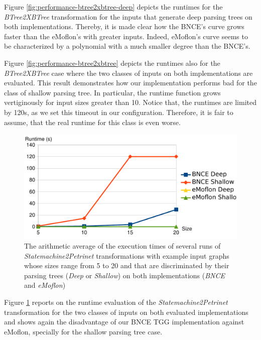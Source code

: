 Figure \ref{fig:performance-btree2xbtree-deep} depicts the runtimes for the \emph{BTree2XBTree} transformation for the inputs that generate deep parsing trees on both implementations. Thereby, it is made clear how the BNCE's curve grows faster than the eMoflon's with greater inputs. Indeed, eMoflon's curve seems to be characterized by a polynomial with a much smaller degree than the BNCE's.

Figure \ref{fig:performance-btree2xbtree} depicts the runtimes also for the \emph{BTree2XBTree} case where the two classes of inputs on both implementations are evaluated. This result demonstrates how our implementation performs bad for the class of shallow parsing tree. In particular, the runtime function grows vertiginously for input sizes greater than 10. Notice that, the runtimes are limited by 120s, as we set this timeout in our configuration. Therefore, it is fair to assume, that the real runtime for this class is even worse.

\begin{figure}
	\centering
	\includegraphics[width=.6\textwidth]{figures/performance/statemachine2petrinet}
	\caption{The arithmetic average of the execution times of several runs of \emph{Statemachine2Petrinet} transformations with example input graphs whose sizes range from 5 to 20 and that are discriminated by their parsing trees (\emph{Deep} or \emph{Shallow}) on both implementations (\emph{BNCE} and \emph{eMoflon})}
	\label{fig:performance-statemachine2petrinet}
\end{figure}

Figure \ref{fig:performance-statemachine2petrinet} reports on the runtime evaluation of the \emph{Statemachine2Petrinet} transformation for the two classes of inputs on both evaluated implementations and shows again the disadvantage of our BNCE TGG implementation against eMoflon, specially for the shallow parsing tree case.

